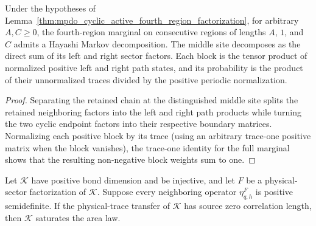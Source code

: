 \begin{lemma}
    \label{thm:mpdo_cyclic_active_markov_all_cuts}
    \leanok
    Under the hypotheses of
    Lemma~\ref{thm:mpdo_cyclic_active_fourth_region_factorization}, for
    arbitrary $A,C\geq 0$, the fourth-region marginal on consecutive regions
    of lengths $A$, $1$, and $C$ admits a Hayashi Markov decomposition.
    The middle site decomposes as the direct sum of its left and right sector
    factors. Each block is the tensor product of normalized positive left
    and right path states, and its probability is the product of their
    unnormalized traces divided by the positive periodic normalization.

\end{lemma}

\begin{proof}\leanok
    Separating the retained chain at the distinguished middle site splits the
    retained neighboring factors into the left and right path products while
    turning the two cyclic endpoint factors into their respective boundary
    matrices. Normalizing each positive block by its trace (using an arbitrary
    trace-one positive matrix when the block vanishes), the trace-one identity
    for the full marginal shows that the resulting non-negative block weights
    sum to one.
\end{proof}

\begin{lemma}
    \label{thm:mpdo_physical_sector_factorization_zcl_sal}
    \leanok
    Let $\mathcal K$ have positive bond dimension and be injective, and let
    $F$ be a physical-sector factorization of $\mathcal K$. Suppose every
    neighboring operator $\eta^F_{q,h}$ is positive semidefinite. If the
    physical-trace transfer of $\mathcal K$ has source zero correlation
    length, then $\mathcal K$ saturates the area law.

\end{lemma}

